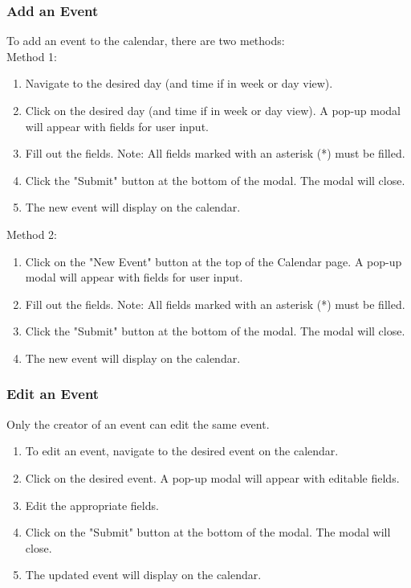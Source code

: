 \documentclass[12pt]{article}
\begin{document}
    \subsubsection{Add an Event}
    To add an event to the calendar, there are two methods: \\
    Method 1:
    \begin{enumerate}
        \item Navigate to the desired day (and time if in week or day view).
        \item Click on the desired day (and time if in week or day view). A pop-up modal will appear with fields for user input.
        \item Fill out the fields. Note: All fields marked with an asterisk (*) must be filled.
        \item Click the "Submit" button at the bottom of the modal. The modal will close.
        \item The new event will display on the calendar.
    \end{enumerate}
    Method 2:
    \begin{enumerate}
        \item Click on the "New Event" button at the top of the Calendar page. A pop-up modal will appear with fields for user input.
        \item Fill out the fields. Note: All fields marked with an asterisk (*) must be filled.
        \item Click the "Submit" button at the bottom of the modal. The modal will close.
        \item The new event will display on the calendar.
    \end{enumerate}

    \subsubsection{Edit an Event}
    Only the creator of an event can edit the same event.
    \begin{enumerate}
        \item To edit an event, navigate to the desired event on the calendar.
        \item Click on the desired event. A pop-up modal will appear with editable fields.
        \item Edit the appropriate fields.
        \item Click on the "Submit" button at the bottom of the modal. The modal will close.
        \item The updated event will display on the calendar.
    \end{enumerate}
\end{document}
